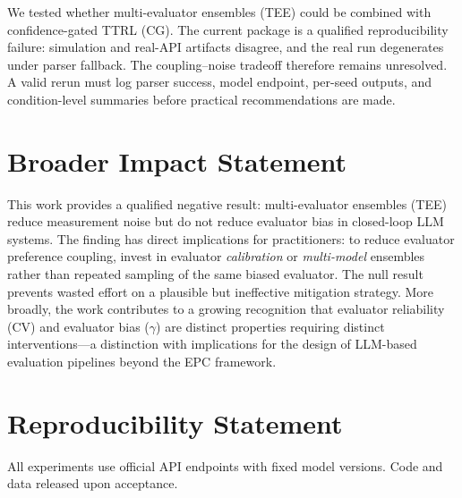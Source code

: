 \documentclass[11pt]{article}
\begin{document}
We tested whether multi-evaluator ensembles (TEE) could be combined with confidence-gated TTRL (CG). The current package is a qualified reproducibility failure: simulation and real-API artifacts disagree, and the real run degenerates under parser fallback. The coupling--noise tradeoff therefore remains unresolved. A valid rerun must log parser success, model endpoint, per-seed outputs, and condition-level summaries before practical recommendations are made.

\section*{Broader Impact Statement}

This work provides a qualified negative result: multi-evaluator ensembles (TEE) reduce measurement noise but do not reduce evaluator bias in closed-loop LLM systems. The finding has direct implications for practitioners: to reduce evaluator preference coupling, invest in evaluator \textit{calibration} or \textit{multi-model} ensembles rather than repeated sampling of the same biased evaluator. The null result prevents wasted effort on a plausible but ineffective mitigation strategy. More broadly, the work contributes to a growing recognition that evaluator reliability (CV) and evaluator bias ($\gamma$) are distinct properties requiring distinct interventions---a distinction with implications for the design of LLM-based evaluation pipelines beyond the EPC framework.

\section*{Reproducibility Statement}
All experiments use official API endpoints with fixed model versions. Code and data released upon acceptance.





\end{document}
